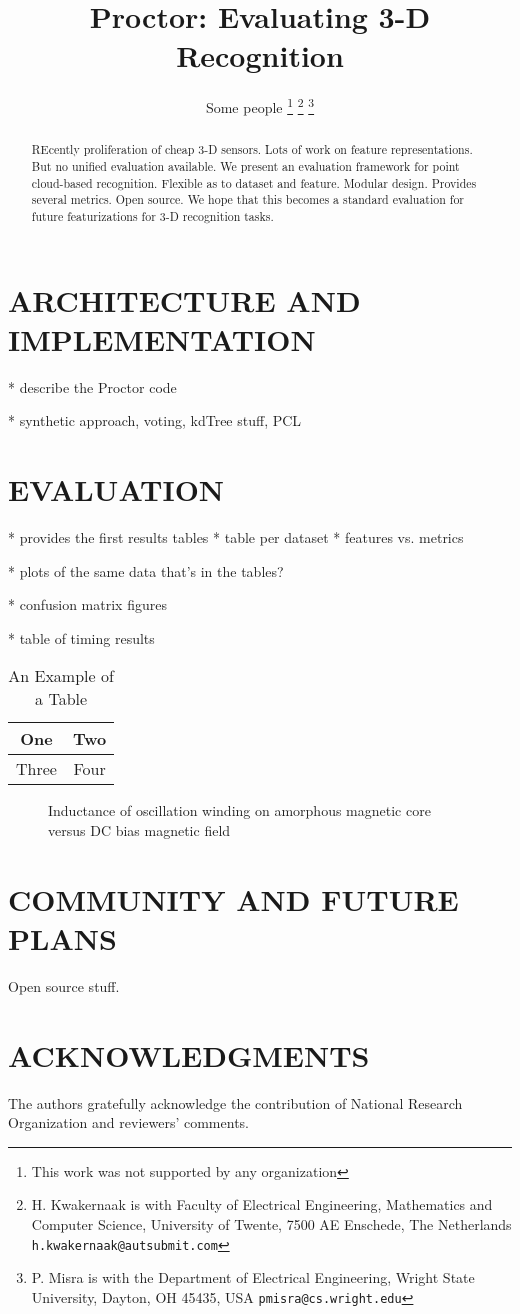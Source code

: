 \documentclass[a4paper, 10pt, conference]{ieeeconf}      %
\title{\LARGE \bf
Proctor: Evaluating 3-D Recognition
}
\author{Some people%
\thanks{This work was not supported by any organization}%
\thanks{H. Kwakernaak is with Faculty of Electrical Engineering, Mathematics and Computer Science,
        University of Twente, 7500 AE Enschede, The Netherlands
        {\tt\small h.kwakernaak@autsubmit.com}}%
\thanks{P. Misra is with the Department of Electrical Engineering, Wright State University,
        Dayton, OH 45435, USA
        {\tt\small pmisra@cs.wright.edu}}%
}
\begin{document}
\maketitle
\thispagestyle{empty}
\pagestyle{empty}

\begin{abstract}

REcently proliferation of cheap 3-D sensors.
Lots of work on feature representations.
But no unified evaluation available.
We present an evaluation framework for point cloud-based recognition.
Flexible as to dataset and feature.
Modular design.
Provides several metrics.
Open source.
We hope that this becomes a standard evaluation for future featurizations for 3-D recognition tasks.

\end{abstract}



\section{ARCHITECTURE AND IMPLEMENTATION}
* describe the Proctor code

* synthetic approach, voting, kdTree stuff, PCL

\section{EVALUATION}

* provides the first results tables
* table per dataset
* features vs. metrics

* plots of the same data that's in the tables?

* confusion matrix figures

* table of timing results

\begin{table}
\caption{An Example of a Table}
\label{table_example}
\begin{center}
\begin{tabular}{|c||c|}
\hline
One & Two\\
\hline
Three & Four\\
\hline
\end{tabular}
\end{center}
\end{table}

\begin{figure}[thpb]
   \centering
   \caption{Inductance of oscillation winding on amorphous
    magnetic core versus DC bias magnetic field}
   \label{figurelabel}
\end{figure}

\section{COMMUNITY AND FUTURE PLANS}

Open source stuff.

\section{ACKNOWLEDGMENTS}

The authors gratefully acknowledge the contribution of National Research Organization and reviewers' comments.

{\small


}
\end{document}
